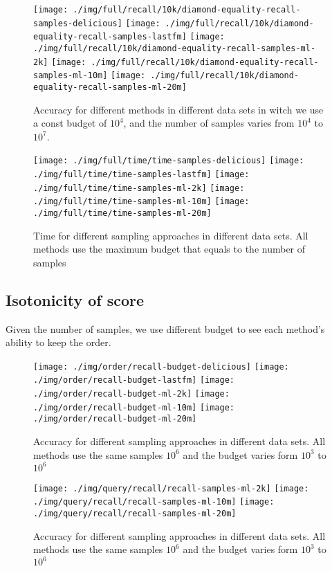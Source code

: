 \documentclass[letterpaper]{article}
\begin{document}
\begin{figure}[ht]
  \centering
  \texttt{[image: ./img/full/recall/10k/diamond-equality-recall-samples-delicious]}
  \texttt{[image: ./img/full/recall/10k/diamond-equality-recall-samples-lastfm]}
  \texttt{[image: ./img/full/recall/10k/diamond-equality-recall-samples-ml-2k]}
  \texttt{[image: ./img/full/recall/10k/diamond-equality-recall-samples-ml-10m]}
  \texttt{[image: ./img/full/recall/10k/diamond-equality-recall-samples-ml-20m]}\\
  \caption{Accuracy for different methods in different data sets in witch we use a const budget of $10^4$, and the number of samples varies from $10^4$ to $10^7$.}
  \label{fig:Recall10kBudget}
\end{figure}

\begin{figure}[ht]
  \centering
  \texttt{[image: ./img/full/time/time-samples-delicious]}
  \texttt{[image: ./img/full/time/time-samples-lastfm]}
  \texttt{[image: ./img/full/time/time-samples-ml-2k]}
  \texttt{[image: ./img/full/time/time-samples-ml-10m]}
  \texttt{[image: ./img/full/time/time-samples-ml-20m]}\\
  \caption{Time for different sampling approaches in different data sets. All methods use the maximum budget that equals to the number of samples}
  \label{fig:Time}
\end{figure}

\subsection{Isotonicity of score}
Given the number of samples, we use different budget to see each method's ability to keep the order.

\begin{figure}[ht]
  \centering
  \texttt{[image: ./img/order/recall-budget-delicious]}
  \texttt{[image: ./img/order/recall-budget-lastfm]}
  \texttt{[image: ./img/order/recall-budget-ml-2k]}
  \texttt{[image: ./img/order/recall-budget-ml-10m]}
  \texttt{[image: ./img/order/recall-budget-ml-20m]}\\
  \caption{Accuracy for different sampling approaches in different data sets. All methods use the same samples $10^6$ and the budget varies form $10^3$ to $10^6$}
  \label{fig:RecallBudget}
\end{figure}
\begin{figure}[ht]
  \centering
  \texttt{[image: ./img/query/recall/recall-samples-ml-2k]}
  \texttt{[image: ./img/query/recall/recall-samples-ml-10m]}
  \texttt{[image: ./img/query/recall/recall-samples-ml-20m]}\\
  \caption{Accuracy for different sampling approaches in different data sets. All methods use the same samples $10^6$ and the budget varies form $10^3$ to $10^6$}
  \label{fig:RecallBudget}
\end{figure}
\end{document}
